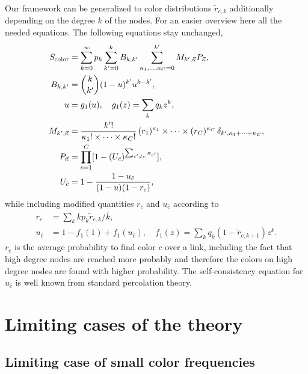 \documentclass[aps, pre, onecolumn, a4paper, floatfix]{revtex4}
\begin{document}
Our framework can be generalized to color distributions  
${\tilde r}_{c,k}$ additionally depending on the degree $k$ of the nodes. For an easier overview 
here all the needed equations. The following equations stay unchanged, 
\begin{align}
S_{\rm color} &= \sum_{k=0}^{\infty}p_k \sum_{k'=0}^{k} B_{k,k'} 
\sum_{\kappa_1,\dots, \kappa_C=0}^{k'} M_{k',\vec \kappa} 
P_{\vec \kappa},\\
B_{k,k'} &={k \choose k'}(1-u)^{k'}u^{k-k'},\\
u &= g_1(u),\quad g_1(z)=\sum_k q_k z^k,\\
M_{k',\vec \kappa} &=\frac{k'!}{\kappa_1! \times \dots \times \kappa_C!} \,
(r_1)^{\kappa_1} \times \dots \times (r_C)^{\kappa_C}\,
\delta_{k',\kappa_1+\dots + \kappa_C},\\
P_{\vec \kappa} &= \prod_{c=1}^C [1-(U_{\bar c})^{\sum_{c'\neq c} \kappa_{c'} }],\\
U_{\bar c} &= 1 - \frac{1-u_{\bar c}}{(1-u)(1-r_c)},
\end{align}
while including modified quantities $r_c$ and $u_{\bar c}$ according to 
\begin{align}
r_c &= \sum_k k p_k {\tilde r}_{c,k}/{\bar k},\\
u_{\bar c} &= 1- f_1(1) +  f_1(u_{\bar c}),\quad f_1(z)=\sum_k q_k (1-{\tilde r}_{c,k+1}) z^k.
\end{align}
$r_c$ is the average probability to find color $c$ over a link, including the fact that 
high degree nodes are reached more probably and therefore the colors on high degree nodes 
are found with higher probability. The self-consistency equation for $u_{\bar c}$ is 
well known from standard percolation theory. 


\section{Limiting cases of the theory}



\subsection{Limiting case of small color frequencies}
\end{document}
